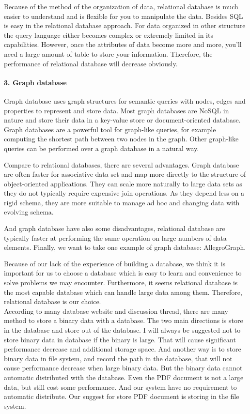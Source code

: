Because of the method of the organization of data, relational database is much easier to understand and is flexible for you to manipulate the data. Besides SQL is easy in the relational database approach. For data organized in other structure the query language either becomes complex or extremely limited in its capabilities. However, once the attributes of data become more and more, you'll need a large amount of table to store your information. Therefore, the performance of relational database will decrease obviously.


\paragraph{3. Graph database}
Graph database uses graph structures for semantic queries with nodes,  edges and properties to represent and store data. Most graph databases are NoSQL in nature and store their data in a key-value store or document-oriented database. Graph databases are a powerful tool for graph-like queries, for example computing the shortest path between two nodes in the graph. Other graph-like queries can be performed over a graph database in a natural way.

Compare to relational databases, there are several advantages. Graph database are often faster for associative data set and map more directly to the structure of object-oriented applications. They can scale more naturally to large data sets as they do not typically require expensive join operations. As they depend less on a rigid schema, they are more suitable to manage ad hoc and changing data with evolving schema.

And graph database have also some disadvantages, relational database are typically faster at performing the same operation on large numbers of data elements. Finally, we want to take one example of graph database: AllegroGraph. 

Because of our lack of the experience of building a database, we think it is important for us to choose a database which is easy to learn and convenience to solve problems we may encounter. Furthermore, it seems relational database is the most capable database which can handle large data among them. Therefore, relational database is our choice.\\


According to many database website and discussion thread, there are many method to store a binary data with a database. The two main directions is store in the database and store out of the database. I will always be suggested not to store binary data in database if the binary is large. That will cause significant performance decrease and additional storage space. And another way is to store binary data in file system, and record the path in the database, that will not cause performance decrease when large binary data. But the binary data cannot automatic distributed with the database. Even the PDF document is not a large data, but still cost some performance. And our system have no requirement to automatic distribute. Our suggest for store PDF document is storing in the file system.

